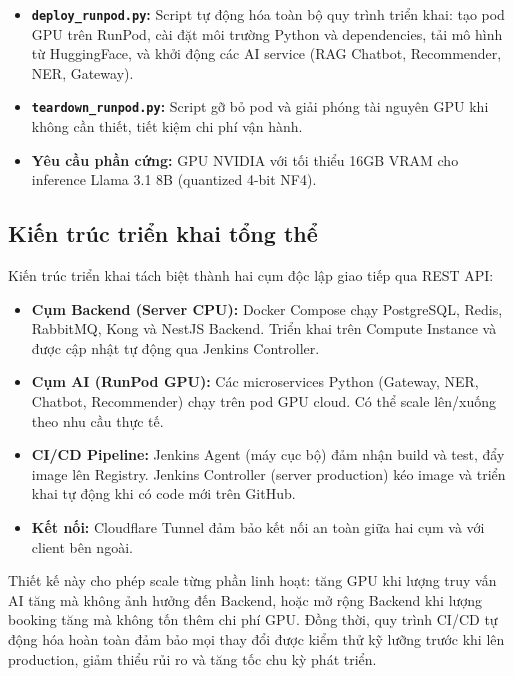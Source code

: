 \begin{itemize}
    \item \textbf{\texttt{deploy\_runpod.py}:} Script tự động hóa toàn bộ quy trình triển khai: tạo pod GPU trên RunPod, cài đặt môi trường Python và dependencies, tải mô hình từ HuggingFace, và khởi động các AI service (RAG Chatbot, Recommender, NER, Gateway).
    \item \textbf{\texttt{teardown\_runpod.py}:} Script gỡ bỏ pod và giải phóng tài nguyên GPU khi không cần thiết, tiết kiệm chi phí vận hành.
    \item \textbf{Yêu cầu phần cứng:} GPU NVIDIA với tối thiểu 16GB VRAM cho inference Llama 3.1 8B (quantized 4-bit NF4).
\end{itemize}

\subsection{Kiến trúc triển khai tổng thể}

Kiến trúc triển khai tách biệt thành hai cụm độc lập giao tiếp qua REST API:

\begin{itemize}
    \item \textbf{Cụm Backend (Server CPU):} Docker Compose chạy PostgreSQL, Redis, RabbitMQ, Kong và NestJS Backend. Triển khai trên Compute Instance và được cập nhật tự động qua Jenkins Controller.
    \item \textbf{Cụm AI (RunPod GPU):} Các microservices Python (Gateway, NER, Chatbot, Recommender) chạy trên pod GPU cloud. Có thể scale lên/xuống theo nhu cầu thực tế.
    \item \textbf{CI/CD Pipeline:} Jenkins Agent (máy cục bộ) đảm nhận build và test, đẩy image lên Registry. Jenkins Controller (server production) kéo image và triển khai tự động khi có code mới trên GitHub.
    \item \textbf{Kết nối:} Cloudflare Tunnel đảm bảo kết nối an toàn giữa hai cụm và với client bên ngoài.
\end{itemize}

Thiết kế này cho phép scale từng phần linh hoạt: tăng GPU khi lượng truy vấn AI tăng mà không ảnh hưởng đến Backend, hoặc mở rộng Backend khi lượng booking tăng mà không tốn thêm chi phí GPU. Đồng thời, quy trình CI/CD tự động hóa hoàn toàn đảm bảo mọi thay đổi được kiểm thử kỹ lưỡng trước khi lên production, giảm thiểu rủi ro và tăng tốc chu kỳ phát triển.

